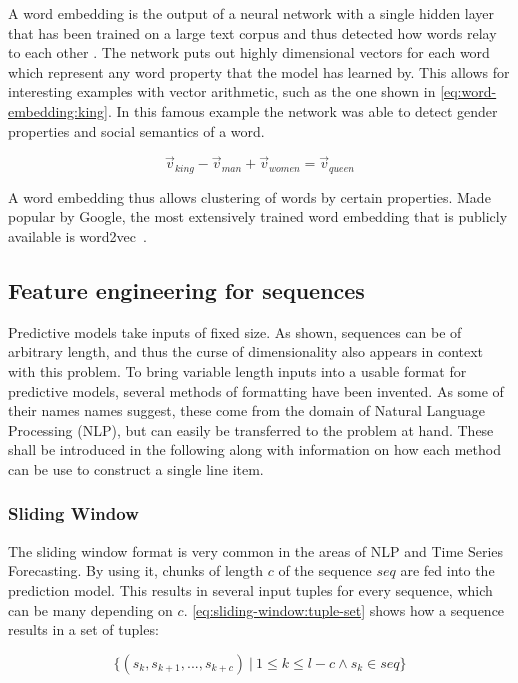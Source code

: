 A word embedding is the output of a neural network with a single hidden layer that has been trained on a large text corpus and thus detected how words relay to each other \cite{web:word-embedding}. The network puts out highly dimensional vectors for each word which represent any word property that the model has learned by. This allows for interesting examples with vector arithmetic, such as the one shown in \autoref{eq:word-embedding:king}. In this famous example the network was able to detect gender properties and social semantics of a word. 

\begin{equation}
    \label{eq:word-embedding:king}
    \vec{v}_{king} - \vec{v}_{man} + \vec{v}_{women} = \vec{v}_{queen}
\end{equation}

A word embedding thus allows clustering of words by certain properties.
Made popular by Google, the most extensively trained word embedding that is publicly available is word2vec~\cite{web:ahogrammer, goldberg2014word2vec}.

\subsection{Feature engineering for sequences}
\label{sec:sequential-feature-engineering}
Predictive models take inputs of fixed size. As shown, sequences can be of arbitrary length, and thus the curse of dimensionality also appears in context with this problem. To bring variable length inputs into a usable format for predictive models, several methods of formatting have been invented. As some of their names names suggest, these come from the domain of Natural Language Processing (NLP), but can easily be transferred to the problem at hand. These shall be introduced in the following along with information on how each method can be use to construct a single line item.

\subsubsection*{Sliding Window}
The sliding window format is very common in the areas of NLP and Time Series Forecasting. By using it, chunks of length $c$ of the sequence $seq$ are fed into the prediction model. This results in several input tuples for every sequence, which can be many depending on $c$. \autoref{eq:sliding-window:tuple-set} shows how a sequence results in a set of tuples:

\begin{equation}
    \label{eq:sliding-window:tuple-set}
    \{ (s_k, s_{k+1}, ..., s_{k+c})\ |\ 1 \leq k \leq l-c \wedge s_k \in seq \}
\end{equation}

